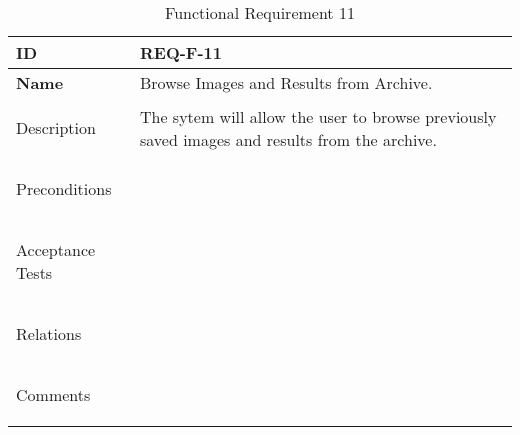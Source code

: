 \begin{table}[H]
    \begin{tabular}[t]{ | >{\bfseries}l | p{9.5cm} |}

    \hline
    ID
    &  REQ-F-11 \\ \hline

    Name
    & Browse Images and Results from Archive. \\ \hline

    Description
    & The sytem will allow the user to browse previously saved images and results from the archive. \\ \hline

    Preconditions
    &  \\ \hline

    Acceptance Tests
    & \\ \hline

    Relations
    &  \\ \hline

    Comments
    &  \\ \hline

    \end{tabular}

    \caption{Functional Requirement 11}
    \label{fig:req_f_11}

\end{table}
